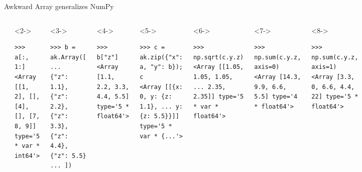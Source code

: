 \documentclass[aspectratio=169]{beamer}
\begin{document}
\begin{frame}[fragile]{Awkward Array generalizes NumPy}
\small
\begin{columns}
\begin{verbatim}
>>> a = ak.Array([[0, 1, 2], [], [3, 4], [5], [6, 7, 8, 9]])
\end{verbatim}
\vspace{-0.3 cm}
\begin{uncoverenv}<2->
\begin{verbatim}
>>> a[:, 1:]
<Array [[1, 2], [], [4], [], [7, 8, 9]] type='5 * var * int64'>
\end{verbatim}
\end{uncoverenv}
\vspace{-0.3 cm}
\begin{uncoverenv}<3->
\begin{verbatim}
>>> b = ak.Array([
...     {"z": 1.1}, {"z": 2.2}, {"z": 3.3}, {"z": 4.4}, {"z": 5.5}
... ])
\end{verbatim}
\end{uncoverenv}
\vspace{-0.3 cm}
\begin{uncoverenv}<4->
\begin{verbatim}
>>> b["z"]
<Array [1.1, 2.2, 3.3, 4.4, 5.5] type='5 * float64'>
\end{verbatim}
\end{uncoverenv}
\vspace{-0.3 cm}
\begin{uncoverenv}<5->
\begin{verbatim}
>>> c = ak.zip({"x": a, "y": b}); c
<Array [[{x: 0, y: {z: 1.1}, ... y: {z: 5.5}}]] type='5 * var * {...'>
\end{verbatim}
\end{uncoverenv}
\vspace{-0.3 cm}
\begin{uncoverenv}<6->
\begin{verbatim}
>>> np.sqrt(c.y.z)
<Array [[1.05, 1.05, 1.05, ... 2.35, 2.35]] type='5 * var * float64'>
\end{verbatim}
\end{uncoverenv}
\vspace{-0.3 cm}
\begin{uncoverenv}<7->
\begin{verbatim}
>>> np.sum(c.y.z, axis=0)
<Array [14.3, 9.9, 6.6, 5.5] type='4 * float64'>
\end{verbatim}
\end{uncoverenv}
\vspace{-0.3 cm}
\begin{uncoverenv}<8->
\begin{verbatim}
>>> np.sum(c.y.z, axis=1)
<Array [3.3, 0, 6.6, 4.4, 22] type='5 * float64'>
\end{verbatim}
\end{uncoverenv}
\end{columns}
\end{frame}
\end{document}
